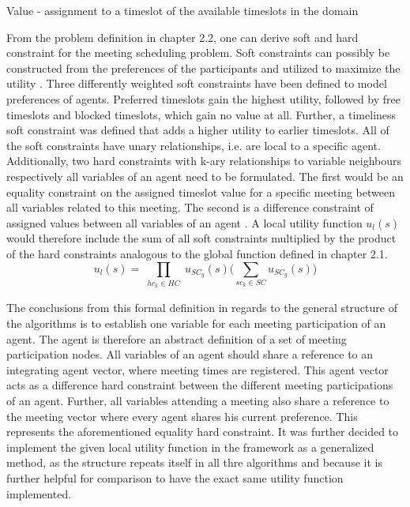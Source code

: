 \begin{hardconstraint2}
Value - assignment to a timeslot of the available timeslots in the domain
\end{hardconstraint2}
From the problem definition in chapter 2.2, one can derive soft and hard constraint for the meeting scheduling problem. Soft constraints can possibly be constructed from the preferences of the participants and utilized to maximize the utility \cite{Franzin}. Three differently weighted soft constraints have been defined to model preferences of agents. Preferred timeslots gain the highest utility, followed by free timeslots and blocked timeslots, which gain no value at all. Further, a timeliness soft constraint was defined that adds a higher utility to earlier timeslots. All of the soft constraints have unary relationships, i.e. are local to a specific agent. %
Additionally, two hard constraints with k-ary relationships to variable neighbours respectively all variables of an agent need to be formulated. The first would be an equality constraint on the assigned timeslot value for a specific meeting between all variables related to this meeting. The second is a difference constraint of assigned values between all variables of an agent \cite{Farinelli} \cite{Scheduling}.
A local utility function \(u_{l}(s)\) would therefore include the sum of all soft constraints multiplied by the product of the hard constraints analogous to the global function defined in chapter 2.1. 
\[ u_{l}(s) = \prod_{\substack{hc_{k} \in HC}} u_{SC_{g}}(s) \bigg( \sum_{sc_{k} \in SC} u_{SC_{g}}(s) \bigg)\] 

The conclusions from this formal definition in regards to the general structure of the algorithms is to establish one variable for each meeting participation of an agent. The agent is therefore an abstract definition of a set of meeting participation nodes. All variables of an agent should share a reference to an integrating agent vector, where meeting times are registered. This agent vector acts as a difference hard constraint between the different meeting participations of an agent. Further, all variables attending a meeting also share a reference to the meeting vector where every agent shares his current preference. This represents the aforementioned equality hard constraint. It was further decided to implement the given local utility function in the framework as a generalized method, as the structure repeats itself in all thre algorithms and because it is further helpful for comparison to have the exact same utility function implemented.

